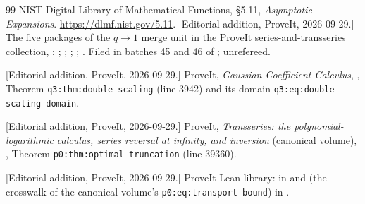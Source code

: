\documentclass[11pt,a4paper]{article}
\numberwithin{equation}{section}
\theoremstyle{definition}\newtheorem{definition}[theorem]{Definition}
\theoremstyle{remark}\newtheorem{remark}[theorem]{Remark}
\begin{document}
\begin{thebibliography}{99}
NIST Digital Library of Mathematical Functions,
\S5.11, \emph{Asymptotic Expansions}.
\url{https://dlmf.nist.gov/5.11}.
[Editorial addition, ProveIt, 2026-09-29.] The five packages of the
$q\to1$ merge unit in the ProveIt series-and-transseries collection,
:
;
;
;
;
.
Filed in batches 45 and 46 of ; unrefereed.

[Editorial addition, ProveIt, 2026-09-29.] ProveIt, \emph{Gaussian
Coefficient Calculus},
,
Theorem \texttt{q3:thm:double-scaling} (line 3942) and its domain
\texttt{q3:eq:double-scaling-domain}.

[Editorial addition, ProveIt, 2026-09-29.] ProveIt, \emph{Transseries: the
polynomial-logarithmic calculus, series reversal at infinity, and
inversion} (canonical volume),
,
Theorem \texttt{p0:thm:optimal-truncation} (line 39360).

[Editorial addition, ProveIt, 2026-09-29.] ProveIt Lean library:
 in
and  (the crosswalk of the canonical volume's
\texttt{p0:eq:transport-bound}) in
.
\end{thebibliography}
\end{document}
